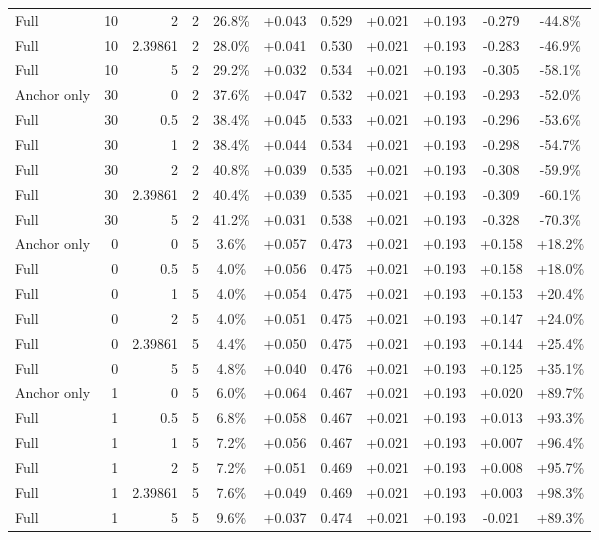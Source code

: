 \begin{table}[htbp]
\begin{tabular}{lrrrccccccc}
Full & 10 & 2 & 2 & 26.8\% & +0.043 & 0.529 & +0.021 & +0.193 & -0.279 & -44.8\% \\
Full & 10 & 2.39861 & 2 & 28.0\% & +0.041 & 0.530 & +0.021 & +0.193 & -0.283 & -46.9\% \\
Full & 10 & 5 & 2 & 29.2\% & +0.032 & 0.534 & +0.021 & +0.193 & -0.305 & -58.1\% \\
Anchor only & 30 & 0 & 2 & 37.6\% & +0.047 & 0.532 & +0.021 & +0.193 & -0.293 & -52.0\% \\
Full & 30 & 0.5 & 2 & 38.4\% & +0.045 & 0.533 & +0.021 & +0.193 & -0.296 & -53.6\% \\
Full & 30 & 1 & 2 & 38.4\% & +0.044 & 0.534 & +0.021 & +0.193 & -0.298 & -54.7\% \\
Full & 30 & 2 & 2 & 40.8\% & +0.039 & 0.535 & +0.021 & +0.193 & -0.308 & -59.9\% \\
Full & 30 & 2.39861 & 2 & 40.4\% & +0.039 & 0.535 & +0.021 & +0.193 & -0.309 & -60.1\% \\
Full & 30 & 5 & 2 & 41.2\% & +0.031 & 0.538 & +0.021 & +0.193 & -0.328 & -70.3\% \\
Anchor only & 0 & 0 & 5 & 3.6\% & +0.057 & 0.473 & +0.021 & +0.193 & +0.158 & +18.2\% \\
Full & 0 & 0.5 & 5 & 4.0\% & +0.056 & 0.475 & +0.021 & +0.193 & +0.158 & +18.0\% \\
Full & 0 & 1 & 5 & 4.0\% & +0.054 & 0.475 & +0.021 & +0.193 & +0.153 & +20.4\% \\
Full & 0 & 2 & 5 & 4.0\% & +0.051 & 0.475 & +0.021 & +0.193 & +0.147 & +24.0\% \\
Full & 0 & 2.39861 & 5 & 4.4\% & +0.050 & 0.475 & +0.021 & +0.193 & +0.144 & +25.4\% \\
Full & 0 & 5 & 5 & 4.8\% & +0.040 & 0.476 & +0.021 & +0.193 & +0.125 & +35.1\% \\
Anchor only & 1 & 0 & 5 & 6.0\% & +0.064 & 0.467 & +0.021 & +0.193 & +0.020 & +89.7\% \\
Full & 1 & 0.5 & 5 & 6.8\% & +0.058 & 0.467 & +0.021 & +0.193 & +0.013 & +93.3\% \\
Full & 1 & 1 & 5 & 7.2\% & +0.056 & 0.467 & +0.021 & +0.193 & +0.007 & +96.4\% \\
Full & 1 & 2 & 5 & 7.2\% & +0.051 & 0.469 & +0.021 & +0.193 & +0.008 & +95.7\% \\
Full & 1 & 2.39861 & 5 & 7.6\% & +0.049 & 0.469 & +0.021 & +0.193 & +0.003 & +98.3\% \\
Full & 1 & 5 & 5 & 9.6\% & +0.037 & 0.474 & +0.021 & +0.193 & -0.021 & +89.3\% \\

\end{tabular}
\end{table}
